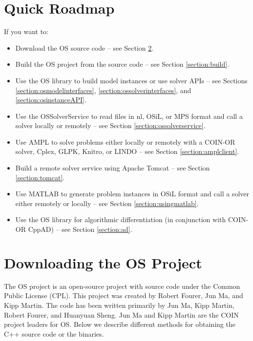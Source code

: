 \documentclass[11pt]{article}
\renewcommand{\_}{{\char"5F}}
\renewcommand{\{}{{\char"7B}}
\renewcommand{\}}{{\char"7D}}
\renewcommand{\^}{{\char"0D}}
\renewcommand{\'}{{\char"0D}}
\begin{document}
\section{Quick Roadmap}\label{section:roadmap}

If you want to:

\begin{itemize}
\item Download  the OS source code -- see Section \ref{section:download}.


\item Build the OS project from the source code -- see Section \ref{section:build}.

\item Use the OS library to build model instances or use solver APIs -- see Sections  \ref{section:osmodelinterfaces},  \ref{section:ossolverinterfaces}, and \ref{section:osinstanceAPI}.

\item Use the OSSolverService to read files in nl, OSiL, or MPS format and call a solver locally or remotely -- see Section \ref{section:ossolverservice}.


\item Use AMPL to solve problems either locally or remotely with a COIN-OR solver, Cplex, GLPK, Knitro, or LINDO -- see Section \ref{section:amplclient}.


\item Build a remote solver service using Apache Tomcat -- see Section \ref{section:tomcat}.

\item Use MATLAB to generate problem instances in OSiL format and call a solver either remotely or locally -- see Section \ref{section:usingmatlab}.

\item Use the OS library for algorithmic differentiation (in conjunction with COIN-OR CppAD) -- see Section \ref{section:ad}.
\end{itemize}





\section{Downloading the OS Project}\label{section:download}

The OS project is an open-source project  with source code under the Common Public License (CPL). This project was created by Robert Fourer, Jun Ma, and Kipp Martin. The code has been written primarily by Jun Ma, Kipp Martin, Robert Fourer, and Huanyuan Sheng.  Jun Ma and Kipp Martin are the COIN project leaders for OS.    Below we describe different methods for obtaining the C++ source code or the binaries.
\end{document}
